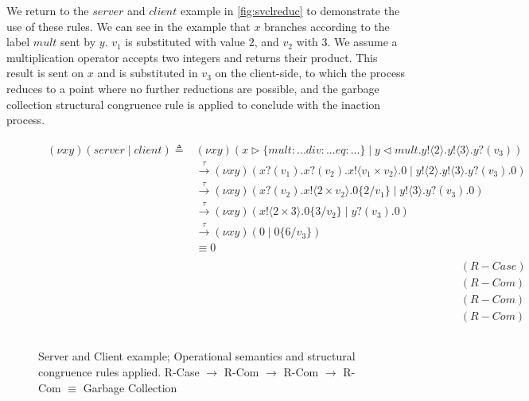 We return to the $server$ and $client$ example in \autoref{fig:svclreduc} to demonstrate the use of these rules. We can see in the example that $x$ branches according to the label $mult$ sent by $y$. $v_1$ is substituted with value 2, and $v_2$ with 3. We assume a multiplication operator accepts two integers and returns their product. This result is sent on $x$ and is substituted in $v_3$ on the client-side, to which the process reduces to a point where no further reductions are possible, and the garbage collection structural congruence rule is applied to conclude with the inaction process.

\begin{figure}[h]
    \centering
    \begin{equation*}
    \begin{split}
        \begin{split}
            (\nu xy)(server\;|\;client) \triangleq & (\nu xy) (x \vartriangleright \{mult:... div:... eq:...\} \; | \; y \vartriangleleft mult.y!\langle 2 \rangle.y!\langle 3 \rangle.y?(v_3) ) \\
            & \xrightarrow{\tau} (\nu xy) (x?(v_1).x?(v_2).x!\langle v_1 \times v_2 \rangle.0 \; | \; y!\langle 2 \rangle.y!\langle 3 \rangle.y?(v_3).0)\\
            &\xrightarrow{\tau} (\nu xy) (x?(v_2).x!\langle 2 \times v_2 \rangle.0\{2/v_1\} \; | \; y!\langle 3 \rangle.y?(v_3).0)\\
            &\xrightarrow{\tau} (\nu xy) (x!\langle 2 \times 3 \rangle.0\{3/v_2\} \; | \; y?(v_3).0)\\
            &\xrightarrow{\tau} (\nu xy) (0 \; | \; 0\{6/v_3\})\\
            & \equiv 0
        \end{split}
        \begin{split}
            & \\
            & (R-Case) \\
            & (R-Com) \\
            & (R-Com) \\
            & (R-Com) \\
            & \\ 
        \end{split}
    \end{split}
    \end{equation*}
    \caption{Server and Client example; Operational semantics and structural congruence rules applied. R-Case $\rightarrow$ R-Com $\rightarrow$ R-Com $\rightarrow$ R-Com $\equiv$ Garbage Collection}
    \label{fig:svclreduc}
\end{figure}

